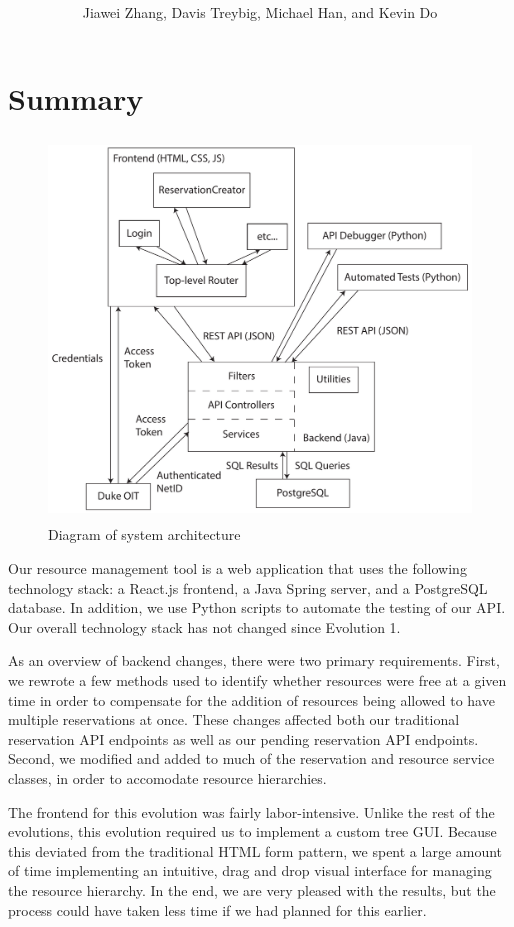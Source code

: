 \documentclass[12pt]{article}
\title{\horrule{5pt}\\\vspace{0.4cm}{\bf \mytitle}\\}
\author{Jiawei Zhang, Davis Treybig, Michael Han, and Kevin Do}
\date{\horrule{1pt}}
\begin{document}
\maketitle{}
\section{Summary}
\begin{figure}[h]
\begin{center}
\includegraphics[height=4in]{../ev2/ev2_design_cropped.pdf}
\end{center}
\caption{Diagram of system architecture}
\label{fig:design}
\end{figure}

Our resource management tool is a web application that uses the following technology stack: a React.js frontend, a Java Spring server, and a PostgreSQL database. In addition, we use Python scripts to automate the testing of our API. Our overall technology stack has not changed since Evolution 1.

As an overview of backend changes, there were two primary requirements. First, we rewrote a few methods used to identify whether resources were free at a given time in order to compensate for the addition of resources being allowed to have multiple reservations at once. These changes affected both our traditional reservation API endpoints as well as our pending reservation API endpoints. Second, we modified and added to much of the reservation and resource service classes, in order to accomodate resource hierarchies.

The frontend for this evolution was fairly labor-intensive. Unlike the rest of the evolutions, this evolution required us to implement a custom tree GUI. Because this deviated from the traditional HTML form pattern, we spent a large amount of time implementing an intuitive, drag and drop visual interface for managing the resource hierarchy. In the end, we are very pleased with the results, but the process could have taken less time if we had planned for this earlier.
\end{document}
